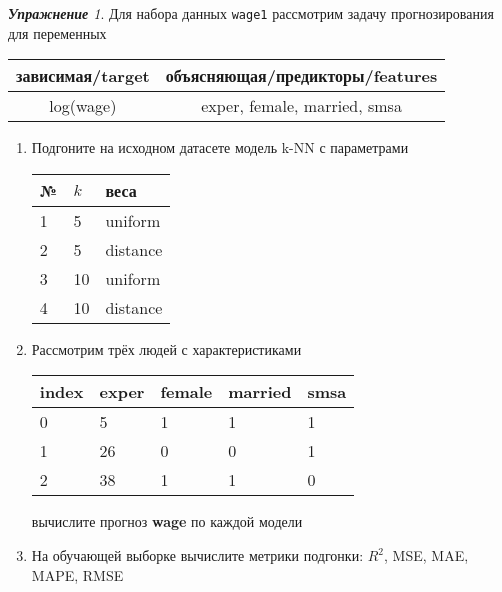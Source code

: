 \documentclass[a4,12pt]{article}
\theoremstyle{remark}
\newtheorem{exercise}{\textbf{Упражнение}}[section]
\begin{document}
\begin{exercise}
Для набора данных \texttt{wage1} рассмотрим задачу прогнозирования
для переменных
\begin{center}
	\begin{tabular}{|c|c|}\hline
		зависимая/target & объясняющая/предикторы/features \\ \hline
		log(wage) & exper, female, married, smsa \\ \hline
	\end{tabular}
\end{center}
\begin{enumerate}
	\item Подгоните на исходном датасете модель k-NN с параметрами
	\begin{center}
		\begin{tabular}{|l|l|l|}\hline
		№ & \(k\) & веса \\ \hline
		1 & 5 & uniform \\
		2 & 5 & distance \\
		3 & 10 & uniform \\
		4 & 10 & distance \\ \hline
		\end{tabular}
	\end{center}
	\item Рассмотрим трёх людей с характеристиками
	\begin{center}
		\begin{tabular}{|l||l|l|l|l|}\hline
			index & exper & female & married & smsa \\ \hline\hline
			0 & 5 & 1 & 1 & 1  \\
			1 & 26 & 0 & 0 & 1 \\
			2 & 38 & 1 & 1 & 0 \\ \hline
		\end{tabular}
	\end{center}
	вычислите прогноз \textbf{wage} по каждой модели

	\item На обучающей выборке вычислите метрики подгонки: \(R^2\), 
	MSE, MAE, MAPE, RMSE
\end{enumerate}
\end{exercise}
\end{document}
